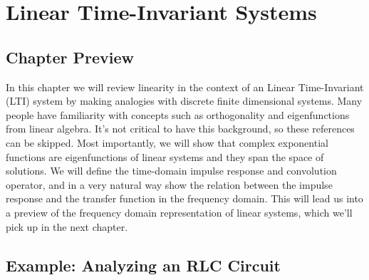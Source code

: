 \chapter{Linear Time-Invariant Systems}
\label{ch:ch01_LTI}
\graphicspath{{./figs_LTI/}}
\section{Chapter Preview}
In this chapter we will review linearity in the context of an Linear Time-Invariant (LTI) system by making analogies with discrete finite dimensional systems.  Many people have familiarity with concepts such as orthogonality and eigenfunctions from linear algebra.  It's not critical to have this background, so these references can be skipped.  Most importantly, we will show that complex exponential functions are eigenfunctions of linear systems and they span the space of solutions.  We will define the time-domain impulse response and convolution operator, and in a very natural way show the relation between the impulse response and the transfer function in the frequency domain.  This will lead us into a preview of the frequency domain representation of linear systems, which we'll pick up in the next chapter.
\section{Example:  Analyzing an RLC Circuit}
